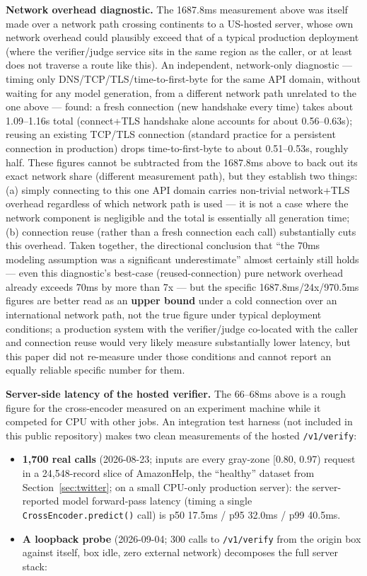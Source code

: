 \documentclass[11pt]{article}
\begin{document}
\textbf{Network overhead diagnostic.} The 1687.8ms measurement above was itself made over a network path crossing continents to a US-hosted server, whose own network overhead could plausibly exceed that of a typical production deployment (where the verifier/judge service sits in the same region as the caller, or at least does not traverse a route like this). An independent, network-only diagnostic --- timing only DNS/TCP/TLS/time-to-first-byte for the same API domain, without waiting for any model generation, from a different network path unrelated to the one above --- found: a fresh connection (new handshake every time) takes about 1.09--1.16s total (connect+TLS handshake alone accounts for about 0.56--0.63s); reusing an existing TCP/TLS connection (standard practice for a persistent connection in production) drops time-to-first-byte to about 0.51--0.53s, roughly half. These figures cannot be subtracted from the 1687.8ms above to back out its exact network share (different measurement path), but they establish two things: (a) simply connecting to this one API domain carries non-trivial network+TLS overhead regardless of which network path is used --- it is not a case where the network component is negligible and the total is essentially all generation time; (b) connection reuse (rather than a fresh connection each call) substantially cuts this overhead. Taken together, the directional conclusion that ``the 70ms modeling assumption was a significant underestimate'' almost certainly still holds --- even this diagnostic's best-case (reused-connection) pure network overhead already exceeds 70ms by more than 7x --- but the specific 1687.8ms/24x/970.5ms figures are better read as an \textbf{upper bound} under a cold connection over an international network path, not the true figure under typical deployment conditions; a production system with the verifier/judge co-located with the caller and connection reuse would very likely measure substantially lower latency, but this paper did not re-measure under those conditions and cannot report an equally reliable specific number for them.

\textbf{Server-side latency of the hosted verifier.} The 66--68ms above is a rough figure for the cross-encoder measured on an experiment machine while it competed for CPU with other jobs. An integration test harness (not included in this public repository) makes two clean measurements of the hosted \texttt{/\allowbreak{}v1/\allowbreak{}verify}:

\begin{itemize}
  \item \textbf{1{,}700 real calls} (2026-08-23; inputs are every gray-zone [0.80, 0.97) request in a 24{,}548-record slice of AmazonHelp, the ``healthy'' dataset from Section~\ref{sec:twitter}; on a small CPU-only production server): the server-reported model forward-pass latency (timing a single \texttt{Cross\allowbreak{}Encoder.\allowbreak{}predict()} call) is p50 17.5ms / p95 32.0ms / p99 40.5ms.
  \item \textbf{A loopback probe} (2026-09-04; 300 calls to \texttt{/\allowbreak{}v1/\allowbreak{}verify} from the origin box against itself, box idle, zero external network) decomposes the full server stack:
\end{itemize}
\end{document}
